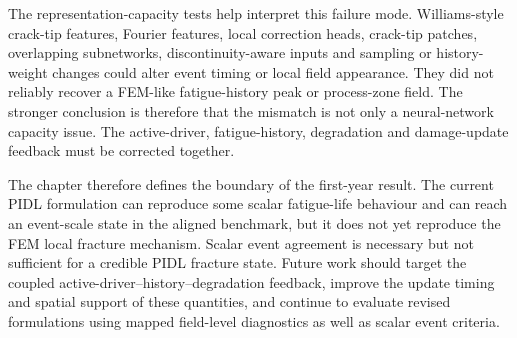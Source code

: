 The representation-capacity tests help interpret this failure mode. Williams-style crack-tip features, Fourier features, local correction heads, crack-tip patches, overlapping subnetworks, discontinuity-aware inputs and sampling or history-weight changes could alter event timing or local field appearance. They did not reliably recover a FEM-like fatigue-history peak or process-zone field. The stronger conclusion is therefore that the mismatch is not only a neural-network capacity issue. The active-driver, fatigue-history, degradation and damage-update feedback must be corrected together.

The chapter therefore defines the boundary of the first-year result. The current PIDL formulation can reproduce some scalar fatigue-life behaviour and can reach an event-scale state in the aligned benchmark, but it does not yet reproduce the FEM local fracture mechanism. Scalar event agreement is necessary but not sufficient for a credible PIDL fracture state. Future work should target the coupled active-driver--history--degradation feedback, improve the update timing and spatial support of these quantities, and continue to evaluate revised formulations using mapped field-level diagnostics as well as scalar event criteria.
